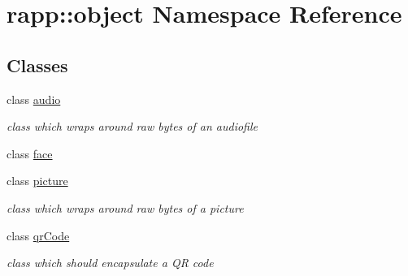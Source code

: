 \hypertarget{namespacerapp_1_1object}{\section{rapp\-:\-:object Namespace Reference}
\label{namespacerapp_1_1object}
}
\subsection*{Classes}
\begin{DoxyCompactItemize}
\item 
class \hyperlink{classrapp_1_1object_1_1audio}{audio}
\begin{DoxyCompactList}\small\item\em class which wraps around raw bytes of an audiofile \end{DoxyCompactList}\item 
class \hyperlink{classrapp_1_1object_1_1face}{face}
\item 
class \hyperlink{classrapp_1_1object_1_1picture}{picture}
\begin{DoxyCompactList}\small\item\em class which wraps around raw bytes of a picture \end{DoxyCompactList}\item 
class \hyperlink{classrapp_1_1object_1_1qrCode}{qr\-Code}
\begin{DoxyCompactList}\small\item\em class which should encapsulate a Q\-R code \end{DoxyCompactList}\end{DoxyCompactItemize}
